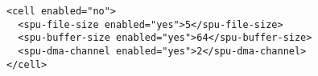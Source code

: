 \begin{verbatim}
<cell enabled="no">
  <spu-file-size enabled="yes">5</spu-file-size>
  <spu-buffer-size enabled="yes">64</spu-buffer-size>
  <spu-dma-channel enabled="yes">2</spu-dma-channel>
</cell>
\end{verbatim}
